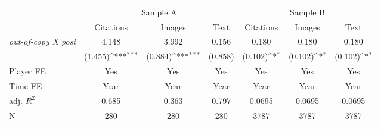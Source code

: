 {
\def\sym#1{\ifmmode^{#1}\else\(^{#1}\)\fi}
\begin{tabular*}{\hsize}{@{\hskip\tabcolsep\extracolsep\fill}l*{6}{c}}
\toprule
            &\multicolumn{3}{c}{Sample A}                                     &\multicolumn{3}{c}{Sample B}                                     \\\cmidrule(lr){2-4}\cmidrule(lr){5-7}
            &\multicolumn{1}{c}{Citations}&\multicolumn{1}{c}{Images}&\multicolumn{1}{c}{Text}&\multicolumn{1}{c}{Citations}&\multicolumn{1}{c}{Images}&\multicolumn{1}{c}{Text}\\
\midrule
\emph{out-of-copy X post}&       4.148         &       3.992         &       0.156         &       0.180         &       0.180         &       0.180         \\
            &     (1.455)\sym{***}&     (0.884)\sym{***}&     (0.858)         &     (0.102)\sym{*}  &     (0.102)\sym{*}  &     (0.102)\sym{*}  \\
\midrule
Player FE   &         Yes         &         Yes         &         Yes         &         Yes         &         Yes         &         Yes         \\
Time FE     &        Year         &        Year         &        Year         &        Year         &        Year         &        Year         \\
adj. $R^2$  &       0.685         &       0.363         &       0.797         &      0.0695         &      0.0695         &      0.0695         \\
N           &         280         &         280         &         280         &        3787         &        3787         &        3787         \\
\bottomrule
\end{tabular*}
}
